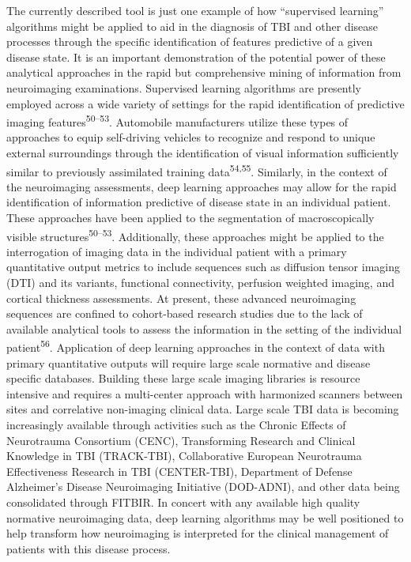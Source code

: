 \documentclass[11pt,]{article}
\begin{document}
The currently described tool is just one example of how ``supervised
learning'' algorithms might be applied to aid in the diagnosis of TBI
and other disease processes through the specific identification of
features predictive of a given disease state. It is an important
demonstration of the potential power of these analytical approaches in
the rapid but comprehensive mining of information from neuroimaging
examinations. Supervised learning algorithms are presently employed
across a wide variety of settings for the rapid identification of
predictive imaging features\textsuperscript{50--53}. Automobile
manufacturers utilize these types of approaches to equip self-driving
vehicles to recognize and respond to unique external surroundings
through the identification of visual information sufficiently similar to
previously assimilated training data\textsuperscript{54,55}. Similarly,
in the context of the neuroimaging assessments, deep learning approaches
may allow for the rapid identification of information predictive of
disease state in an individual patient. These approaches have been
applied to the segmentation of macroscopically visible
structures\textsuperscript{50--53}. Additionally, these approaches might
be applied to the interrogation of imaging data in the individual
patient with a primary quantitative output metrics to include sequences
such as diffusion tensor imaging (DTI) and its variants, functional
connectivity, perfusion weighted imaging, and cortical thickness
assessments. At present, these advanced neuroimaging sequences are
confined to cohort-based research studies due to the lack of available
analytical tools to assess the information in the setting of the
individual patient\textsuperscript{56}. Application of deep learning
approaches in the context of data with primary quantitative outputs will
require large scale normative and disease specific databases. Building
these large scale imaging libraries is resource intensive and requires a
multi-center approach with harmonized scanners between sites and
correlative non-imaging clinical data. Large scale TBI data is becoming
increasingly available through activities such as the Chronic Effects of
Neurotrauma Consortium (CENC), Transforming Research and Clinical
Knowledge in TBI (TRACK-TBI), Collaborative European Neurotrauma
Effectiveness Research in TBI (CENTER-TBI), Department of Defense
Alzheimer's Disease Neuroimaging Initiative (DOD-ADNI), and other data
being consolidated through FITBIR. In concert with any available high
quality normative neuroimaging data, deep learning algorithms may be
well positioned to help transform how neuroimaging is interpreted for
the clinical management of patients with this disease process.
\end{document}
